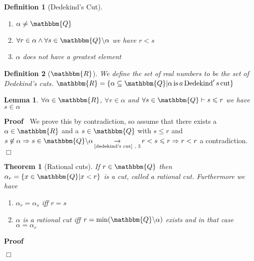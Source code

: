 \documentclass{book}
\newcommand{\Rightarrowlim}{\mathop{\rightarrow}\limits}
\newcommand{\nin}{\not\in}
\newcommand{\nobracket}{}
\newcommand{\tmop}[1]{\ensuremath{\operatorname{#1}}}
\newenvironment{proof}{\noindent\textbf{Proof\ }}{\hspace*{\fill}$\Box$\medskip}
\newtheorem{definition}{Definition}
{\theorembodyfont{\rmfamily}\newtheorem{example}{Example}}
\newtheorem{lemma}{Lemma}
\newtheorem{theorem}{Theorem}
\begin{document}
{{\begin{definition}[Dedekind's Cut]
\begin{enumerate}
    \item $\alpha \neq \mathbbm{Q}$
    
    \item $\forall r \in \alpha \wedge \forall s \in \mathbbm{Q} \backslash
    \alpha$ we have $r < s$
    
    \item $\alpha$ does not have a greatest element
  \end{enumerate}
\end{definition}

\begin{definition}[$\mathbbm{R}$]
  \label{the real numbers}{}{}We
  define the set of real numbers to be the set of Dedekind's cuts.
  $\mathbbm{R}= \{ \alpha \subseteq \mathbbm{Q} | \alpha \tmop{is} a
  \tmop{Dedekind}' s \tmop{cut} \nobracket \}$
\end{definition}

\begin{lemma}
  \label{property to determine membership of a cut}$\forall \alpha \in
  \mathbbm{R}$, $\forall r \in \alpha$ and $\forall s \in \mathbbm{Q} \vdash s
  \leqslant r$ we have $s \in \alpha$
\end{lemma}

\begin{proof}
  We prove this by contradiction, so assume that there exists a $\alpha \in
  \mathbbm{R}$ and a $s \in \mathbbm{Q}$ with $s \leqslant r$ and $s \nin
  \alpha \Rightarrow s \in \mathbbm{Q} \backslash \alpha
  \Rightarrowlim_{\text{\ref{dedekind's cut} , 3}} r < s \leqslant r
  \Rightarrow r < r$ a contradiction. 
\end{proof}

\begin{theorem}[Rational cuts]
  \label{rational cuts}{}If $r \in \mathbbm{Q}$ then
  $\alpha_r = \{ x \in \mathbbm{Q} | x < r \nobracket \}$ is a cut, called a
  rational cut. Furthermore we have
  \begin{enumerate}
    \item $\alpha_r = \alpha_s$ iff $r = s$
    
    \item $\alpha$ is a rational cut iff $r = \min (\mathbbm{Q} \backslash
    \alpha)$ exists and in that case $\alpha = \alpha_r$
  \end{enumerate}
\end{theorem}

\begin{proof}
  

\end{proof}}}
\end{document}
